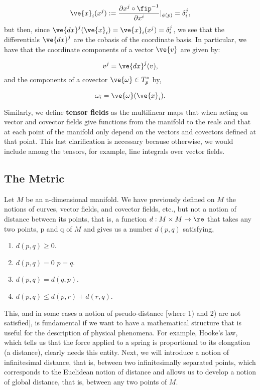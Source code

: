 \[
 \ve{x}_{i} (x^{j}) := \frac{\partial x^{j}\circ\fip^{-1}}{\partial x^{i}}|_{\phi(p)} = \delta^{j}_{i},
 \]
 but then, since $\ve{dx}^{j}(\ve{x}_{i})=\ve{x}_{i} (x^{j}) = \delta^{j}_{i}$, we see that the differentials
 $ \ve{dx}^{j}$ are the cobasis of the coordinate basis. 
 In particular, we have that the coordinate components of a vector $\ve{v}$ are given by:
 
 \[
 v^{j} = \ve{dx}^{j}(v),
 \]
%
and the components of a covector $\ve{\omega} \in T_{p}^{*}$ by,

\[
\omega_{i} = \ve{\omega}(\ve{x}_{i}).
\]
 
Similarly, we define {\bf tensor fields} as the multilinear maps
that when acting on vector and covector fields give functions
from the manifold to the reals and that at each point of the manifold only 
depend on the vectors and covectors defined at that point. 
This last clarification is
necessary because otherwise, we would include among the tensors, for
example, line integrals over vector fields.
 

\subsection{The Metric}


Let $M$ be an n-dimensional manifold. We have previously defined on $M$
the notions of curves, vector fields, and covector fields, etc., but
not a notion of distance between its points, that is, a function 
$d: M \times M \rightarrow \re$ that takes any two points, p and q of
$M$ and gives us a number $d(p,q)$ satisfying,
\begin{enumerate}
\item $d(p,q) \geq 0$.
\item $d(p,q) = 0 $ \sii $p=q$.
\item $d(p,q) = d(q,p)$.
\item $d(p,q) \leq d(p,r) + d(r,q)$.
\end{enumerate}
 
This, and in some cases a notion of pseudo-distance [where 1) and
2) are not satisfied], is fundamental if we want to have a mathematical structure 
that is useful for the description of physical phenomena. 
For example,
Hooke's law, which tells us that the force applied to
a spring is proportional to its elongation (a distance),
clearly needs this entity.
Next, we will introduce a notion of infinitesimal distance,
that is, between two infinitesimally separated points, which corresponds
to the Euclidean notion of distance and allows us to develop a notion of
global distance, that is, between any two points of $M$.

